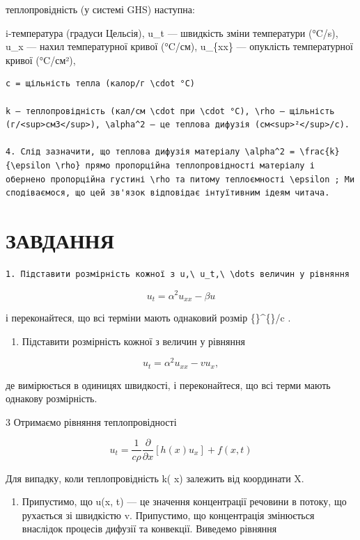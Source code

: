 \documentclass[
  ukrainian,
]{article}
\providecommand{\tightlist}{%
  \setlength{\itemsep}{0pt}\setlength{\parskip}{0pt}}
\begin{document}
теплопровідність (у системі GHS) наступна:

i-температура (градуси Цельсія), u\_t --- швидкість зміни температури
(°C/s), u\_x --- нахил температурної кривої (°C/см), u\_\{xx\} ---
опуклість температурної кривої (°C/см²),

\begin{verbatim}
c = щільність тепла (калор/г \cdot °C)

k — теплопровідність (кал/см \cdot при \cdot °C), \rho — щільність (г/<sup>см3</sup>), \alpha^2 — це теплова дифузія (см<sup>²</sup>/с).

4. Слід зазначити, що теплова дифузія матеріалу \alpha^2 = \frac{k}{\epsilon \rho} прямо пропорційна теплопровідності матеріалу і обернено пропорційна густині \rho та питому теплоємності \epsilon ; Ми сподіваємося, що цей зв'язок відповідає інтуїтивним ідеям читача.
\end{verbatim}

\section{ЗАВДАННЯ}\label{ux437ux430ux432ux434ux430ux43dux43dux44f}

\begin{verbatim}
1. Підставити розмірність кожної з u,\ u_t,\ \dots величин у рівняння
\end{verbatim}

\[
u_t = \alpha^2 u_{xx} - \beta u
\]

і переконайтеся, що всі терміни мають однаковий розмір
\{\}\^{}\{\circ\}/c .

\begin{enumerate}
\def\labelenumi{\arabic{enumi}.}
\setcounter{enumi}{1}
\tightlist
\item
  Підставити розмірність кожної з величин у рівняння
\end{enumerate}

\[
u_t = \alpha^2 u_{xx} - v u_x,
\]

де \upsilon вимірюється в одиницях швидкості, і переконайтеся, що всі
терми мають однакову розмірність.

3 Отримаємо рівняння теплопровідності

\[
u_{t} = \frac{1}{c\rho} \frac{\partial}{\partial x} [h(x) u_{x}] + f(x, t)
\]

Для випадку, коли теплопровідність k\left( x\right) залежить від
координати X.

\begin{enumerate}
\def\labelenumi{\arabic{enumi}.}
\setcounter{enumi}{3}
\tightlist
\item
  Припустимо, що u(x, t) --- це значення концентрації речовини в потоку,
  що рухається зі швидкістю v. Припустимо, що концентрація змінюється
  внаслідок процесів дифузії та конвекції. Виведемо рівняння
\end{enumerate}
\end{document}
